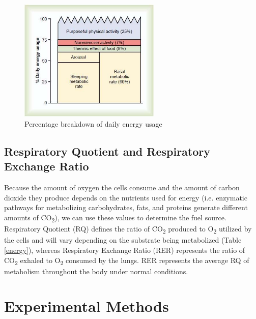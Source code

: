 \documentclass{article}
\begin{document}
\begin{figure}[h]
\centering\includegraphics[width=0.6\textwidth]{../images/BMR_1.jpg}
\caption{Percentage breakdown of daily energy usage}
\label{bmr}
\end{figure}

\subsection*{Respiratory Quotient and Respiratory Exchange Ratio}
Because the amount of oxygen the cells consume and the amount of carbon dioxide they produce depends on the nutrients used for energy (i.e. enzymatic pathways for metabolizing carbohydrates, fats, and proteins generate different amounts of CO\textsubscript{2}), we can use these values to determine the fuel source.\\

Respiratory Quotient (RQ) defines the ratio of CO\textsubscript{2} produced to O\textsubscript{2} utilized by the cells and will vary depending on the substrate being metabolized (Table \ref{energy}), whereas Respiratory Exchange Ratio (RER) represents the ratio of CO\textsubscript{2} exhaled to O\textsubscript{2} consumed by the lungs. RER represents the average RQ of metabolism throughout the body under normal conditions.

\section*{Experimental Methods}
\end{document}
